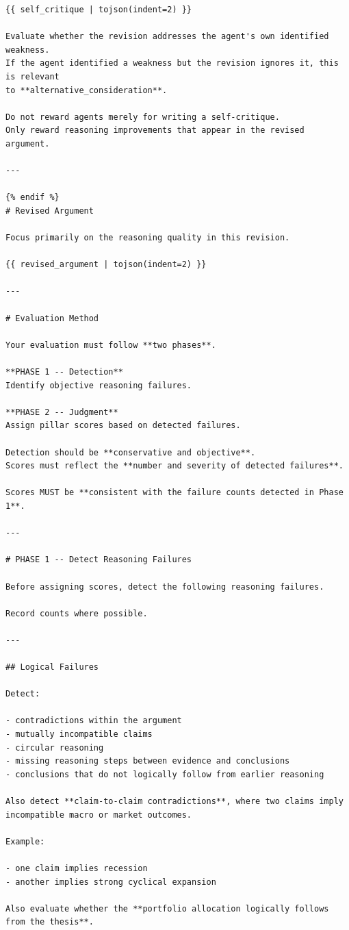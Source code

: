 \documentclass{article}
\begin{document}
\begin{lstlisting}[backgroundcolor=\color{promptbg}]
{{ self_critique | tojson(indent=2) }}

Evaluate whether the revision addresses the agent's own identified weakness.
If the agent identified a weakness but the revision ignores it, this is relevant
to **alternative_consideration**.

Do not reward agents merely for writing a self-critique.
Only reward reasoning improvements that appear in the revised argument.

---

{% endif %}
# Revised Argument

Focus primarily on the reasoning quality in this revision.

{{ revised_argument | tojson(indent=2) }}

---

# Evaluation Method

Your evaluation must follow **two phases**.

**PHASE 1 -- Detection**
Identify objective reasoning failures.

**PHASE 2 -- Judgment**
Assign pillar scores based on detected failures.

Detection should be **conservative and objective**.
Scores must reflect the **number and severity of detected failures**.

Scores MUST be **consistent with the failure counts detected in Phase 1**.

---

# PHASE 1 -- Detect Reasoning Failures

Before assigning scores, detect the following reasoning failures.

Record counts where possible.

---

## Logical Failures

Detect:

- contradictions within the argument
- mutually incompatible claims
- circular reasoning
- missing reasoning steps between evidence and conclusions
- conclusions that do not logically follow from earlier reasoning

Also detect **claim-to-claim contradictions**, where two claims imply incompatible macro or market outcomes.

Example:

- one claim implies recession
- another implies strong cyclical expansion

Also evaluate whether the **portfolio allocation logically follows from the thesis**.


\end{lstlisting}
\end{document}
